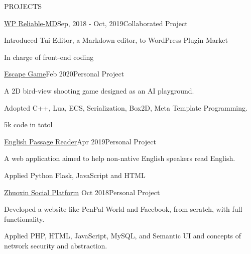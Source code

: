 \documentclass{resume} %
\begin{document}
\begin{rSection}{PROJECTS}
\begin{rSubsection}{\href{https://github.com/jackworkshop/WP-ReliableMD}{WP Reliable-MD}}{Sep, 2018 - Oct, 2019}{Collaborated Project}{}
    \item Introduced Tui-Editor, a Markdown editor, to WordPress Plugin Market
    \item In charge of front-end coding
\end{rSubsection}

\begin{rSubsection}{\href{https://github.com/qiujiangkun/Escape}{Escape Game}}{Feb 2020}{Personal Project}{}
    \item A 2D bird-view shooting game designed as an AI playground.
    \item Adopted C++, Lua, ECS, Serialization, Box2D, Meta Template Programming.
    \item 5k code in totol
\end{rSubsection}
\begin{rSubsection}{\href{https://github.com/qiujiangkun/EnglishPassageReader}{English Passage Reader}}{Apr 2019}{Personal Project}{}
    \item A web application aimed to help non-native English speakers read English.
    \item Applied Python Flask, JavaScript and HTML
\end{rSubsection}

\begin{rSubsection}{\href{https://github.com/qiujiangkun/ZhuoxinSocialWebsite}{Zhuoxin Social Platform}} {Oct 2018}{Personal Project}{}

\item Developed a website like PenPal World and Facebook, from scratch, with full functionality.

\item Applied PHP, HTML, JavaScript, MySQL, and Semantic UI and concepts of network security and abstraction.

\end{rSubsection}



\end{rSection}
\end{document}
